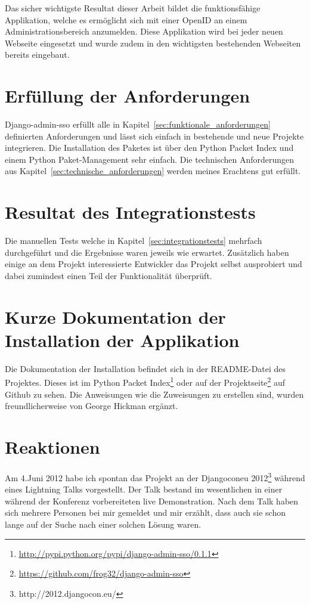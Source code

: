 Das sicher wichtigste Resultat dieser Arbeit bildet die funktionsfähige Applikation, welche es ermöglicht sich mit einer OpenID an einem Administrationsbereich anzumelden. Diese Applikation wird bei jeder neuen Webseite eingesetzt und wurde zudem in den wichtigsten bestehenden Webseiten bereits eingebaut.

\section{Erfüllung der Anforderungen}
\label{sec:erfüllung_der_anforderungen}
Django-admin-sso erfüllt alle in Kapitel~\ref{sec:funktionale_anforderungen} definierten Anforderungen und lässt sich einfach in bestehende und neue Projekte integrieren. Die Installation des Paketes ist über den Python Packet Index und einem Python Paket-Management sehr einfach. Die technischen Anforderungen aus Kapitel~\ref{sec:technische_anforderungen} werden meines Erachtens gut erfüllt.

\section{Resultat des Integrationstests}
\label{sec:resultat_des_integrationstests}
Die manuellen Tests welche in Kapitel~\ref{sec:integrationstests} mehrfach durchgeführt und die Ergebnisse waren jeweils wie erwartet. Zusätzlich haben einige an dem Projekt interessierte Entwickler das Projekt selbst ausprobiert und dabei zumindest einen Teil der Funktionalität überprüft.

\section{Kurze Dokumentation der Installation der Applikation}
\label{sec:kurze_dokumentation_der_installation_der_applikation}
Die Dokumentation der Installation befindet sich in der README-Datei des Projektes. Dieses ist im Python Packet Index\footnote{\url{http://pypi.python.org/pypi/django-admin-sso/0.1.1}} oder auf der Projektseite\footnote{\url{https://github.com/frog32/django-admin-sso}} auf Github zu sehen. Die Anweisungen wie die Zuweisungen zu erstellen sind, wurden freundlicherweise von George Hickman ergänzt.

\section{Reaktionen}
\label{sec:reaktionen}
Am 4.Juni 2012 habe ich spontan das Projekt an der Djangoconeu 2012\footnote{http://2012.djangocon.eu/} während eines Lightning Talks vorgestellt. Der Talk bestand im wesentlichen in einer während der Konferenz vorbereiteten live Demonstration. Nach dem Talk haben sich mehrere Personen bei mir gemeldet und mir erzählt, dass auch sie schon lange auf der Suche nach einer solchen Lösung waren.


